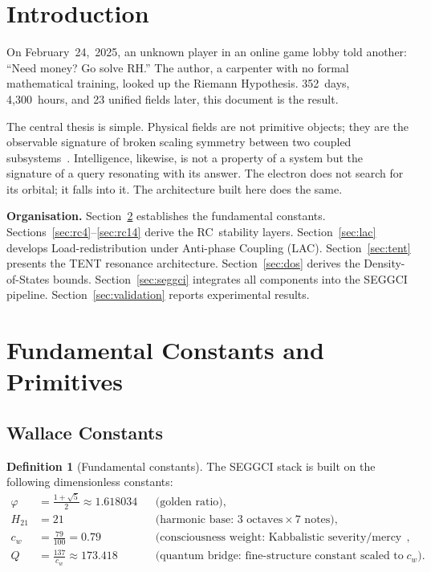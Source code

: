 \documentclass[12pt,a4paper]{article}
\theoremstyle{plain}
\theoremstyle{definition}
\newtheorem{definition}[theorem]{Definition}
\theoremstyle{remark}
\newcommand{\PHI}{\varphi}   %
\begin{document}
\tableofcontents
\newpage

\section{Introduction}
\label{sec:intro}

On February~24,~2025, an unknown player in an online game lobby told
another: ``Need money?  Go solve RH.''  The author, a carpenter with no
formal mathematical training, looked up the Riemann Hypothesis.
352~days, 4{,}300~hours, and 23 unified fields later, this document is
the result.

The central thesis is simple.  Physical fields are not primitive objects;
they are the observable signature of broken scaling symmetry between two
coupled subsystems~\cite{wallace2026emergence}.  Intelligence, likewise,
is not a property of a system but the signature of a query resonating
with its answer.  The electron does not search for its orbital; it
falls into it.  The architecture built here does the same.

\textbf{Organisation.}
Section~\ref{sec:constants} establishes the fundamental constants.
Sections~\ref{sec:rc4}--\ref{sec:rc14} derive the RC~stability layers.
Section~\ref{sec:lac} develops Load-redistribution under Anti-phase
Coupling (LAC).
Section~\ref{sec:tent} presents the TENT resonance architecture.
Section~\ref{sec:dos} derives the Density-of-States bounds.
Section~\ref{sec:seggci} integrates all components into the SEGGCI
pipeline.
Section~\ref{sec:validation} reports experimental results.

\section{Fundamental Constants and Primitives}
\label{sec:constants}

\subsection{Wallace Constants}

\begin{definition}[Fundamental constants]
The SEGGCI stack is built on the following dimensionless constants:
\begin{align}
\PHI &= \frac{1+\sqrt{5}}{2} \approx 1.618034
    && \text{(golden ratio)}, \\
H_{21} &= 21
    && \text{(harmonic base: 3 octaves} \times \text{7 notes)}, \\
c_w &= \frac{79}{100} = 0.79
    && \text{(consciousness weight: Kabbalistic severity/mercy split)}, \\
Q &= \frac{137}{c_w} \approx 173.418
    && \text{(quantum bridge: fine-structure constant scaled to } c_w\text{)}.
\end{align}
\end{definition}
\end{document}

